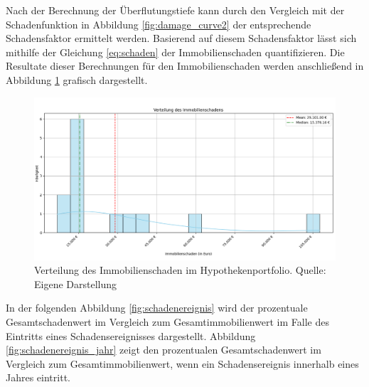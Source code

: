 Nach der Berechnung der Überflutungstiefe kann durch den Vergleich mit der Schadenfunktion in Abbildung \ref{fig:damage_curve2} der entsprechende Schadensfaktor ermittelt werden. Basierend auf diesem Schadensfaktor lässt sich mithilfe der Gleichung \ref{eq:schaden} der Immobilienschaden quantifizieren. Die Resultate dieser Berechnungen für den Immobilienschaden werden anschließend in Abbildung \ref{fig:schadenwert} grafisch dargestellt.
\begin{figure}[htbp]
    \centering
    \includegraphics[width=\textwidth]{figures/flutschaden.png}
    \caption{Verteilung des Immobilienschaden im Hypothekenportfolio. Quelle: Eigene Darstellung}
    \label{fig:schadenwert}
\end{figure}
\FloatBarrier
In der folgenden Abbildung \ref{fig:schadenereignis} wird der prozentuale Gesamtschadenwert im Vergleich zum Gesamtimmobilienwert im Falle des Eintritts eines Schadensereignisses dargestellt. Abbildung \ref{fig:schadenereignis_jahr} zeigt den prozentualen Gesamtschadenwert im Vergleich zum Gesamtimmobilienwert, wenn ein Schadensereignis innerhalb eines Jahres eintritt.

